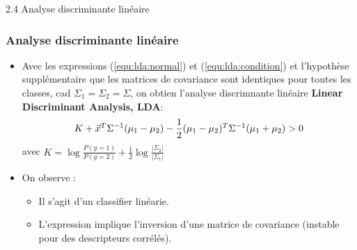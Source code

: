\begin{frame}{2.4 Analyse discriminante linéaire}
\frametitle{Analyse discriminante linéaire}
\begin{itemize}
\item Avec les expressions (\ref{equ:lda:normal}) et (\ref{equ:lda:condition}) et l'hypothèse supplémentaire que les matrices de covariance sont identiques pour toutes les classes, cad
$\Sigma_1 = \Sigma_2 = \Sigma$, on obtien l'analyse discrimnante linéaire {\bf Linear Discriminant Analysis, LDA}:
\begin{equation*}
K + \vec{x}^T\Sigma^{-1}(\mu_1-\mu_2) - \frac{1}{2}(\mu_1-\mu_2)^T\Sigma^{-1}(\mu_1+\mu_2) > 0
\end{equation*}
avec $K=\log{\frac{P(y=1)}{P(y=2)}} + \frac{1}{2}\log{\frac{|\Sigma_2|}{|\Sigma_1|}}$
\item On observe : 
\begin{itemize}
  \item Il s'agit d'un classifier linéarie. 
  \item L'expression implique l'inversion d'une matrice de covariance (instable pour des descripteurs corrélés). 
\end{itemize} 
\end{itemize} 
\end{frame}





